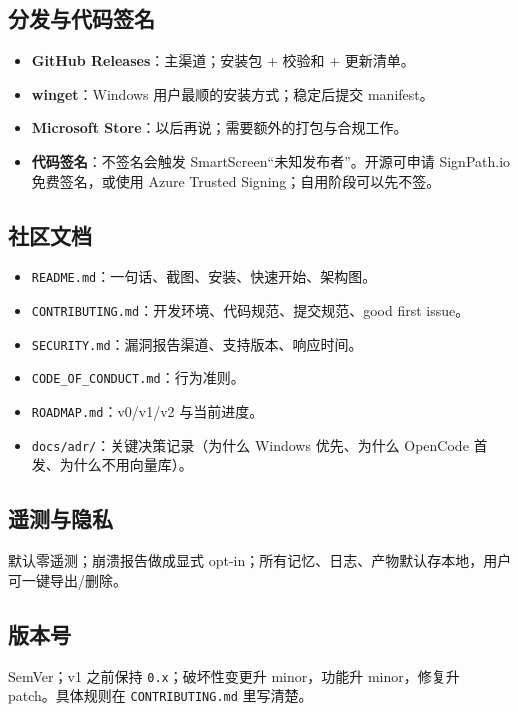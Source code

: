 \documentclass[UTF8,11pt,a4paper,fontset=windows]{ctexart}
\let\ocsubsection\subsection
\renewcommand{\subsection}{\Needspace{5\baselineskip}\ocsubsection}
\newcommand{\code}[1]{\texttt{#1}}
\begin{document}
\subsection{分发与代码签名}

\begin{itemize}
  \item \textbf{GitHub Releases}：主渠道；安装包 + 校验和 + 更新清单。
  \item \textbf{winget}：Windows 用户最顺的安装方式；稳定后提交 manifest。
  \item \textbf{Microsoft Store}：以后再说；需要额外的打包与合规工作。
  \item \textbf{代码签名}：不签名会触发 SmartScreen“未知发布者”。开源可申请 SignPath.io 免费签名，或使用 Azure Trusted Signing；自用阶段可以先不签。
\end{itemize}

\subsection{社区文档}

\begin{itemize}
  \item \code{README.md}：一句话、截图、安装、快速开始、架构图。
  \item \code{CONTRIBUTING.md}：开发环境、代码规范、提交规范、good first issue。
  \item \code{SECURITY.md}：漏洞报告渠道、支持版本、响应时间。
  \item \code{CODE\_OF\_CONDUCT.md}：行为准则。
  \item \code{ROADMAP.md}：v0/v1/v2 与当前进度。
  \item \code{docs/adr/}：关键决策记录（为什么 Windows 优先、为什么 OpenCode 首发、为什么不用向量库）。
\end{itemize}

\subsection{遥测与隐私}

默认零遥测；崩溃报告做成显式 opt-in；所有记忆、日志、产物默认存本地，用户可一键导出/删除。

\subsection{版本号}

SemVer；v1 之前保持 \code{0.x}；破坏性变更升 minor，功能升 minor，修复升 patch。具体规则在 \code{CONTRIBUTING.md} 里写清楚。
\end{document}
